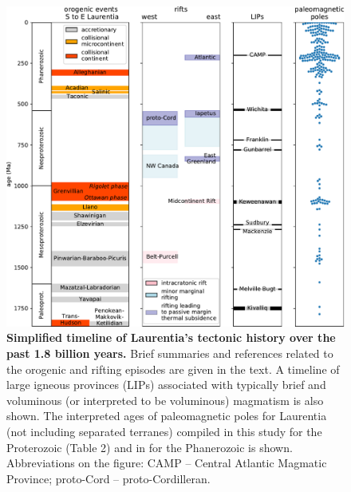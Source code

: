 \documentclass[twocolumn, switch]{article} %
\begin{document}
\begin{figure}
\centering
\includegraphics[width=\textwidth]{../Figures/Fig2_Tectonic_history.pdf}
\caption{\textbf{Simplified timeline of Laurentia's tectonic history over the past 1.8 billion years.} Brief summaries and references related to the orogenic and rifting episodes are given in the text. A timeline of large igneous provinces (LIPs) associated with typically brief and voluminous (or interpreted to be voluminous) magmatism is also shown. The interpreted ages of paleomagnetic poles for Laurentia (not including separated terranes) compiled in this study for the Proterozoic (Table 2) and in \cite{Torsvik2012a} for the Phanerozoic is shown. Abbreviations on the figure: CAMP -- Central Atlantic Magmatic Province; proto-Cord -- proto-Cordilleran.}
\label{fig:tectonic_history}
\end{figure}
\end{document}
